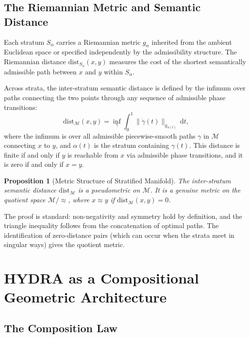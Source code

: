 \documentclass[12pt, a4paper, openany]{book}
\theoremstyle{plain}
\newtheorem{proposition}[theorem]{Proposition}
\theoremstyle{definition}
\theoremstyle{remark}
\begin{document}
\section{The Riemannian Metric and Semantic Distance}

Each stratum $S_\alpha$ carries a Riemannian metric $g_\alpha$ inherited from the ambient Euclidean space or specified independently by the admissibility structure. The Riemannian distance $\mathrm{dist}_{S_\alpha}(x, y)$ measures the cost of the shortest semantically admissible path between $x$ and $y$ within $S_\alpha$.

Across strata, the inter-stratum semantic distance is defined by the infimum over paths connecting the two points through any sequence of admissible phase transitions:
\[
\mathrm{dist}_{\mathcal{M}}(x, y) = \inf_{\gamma} \int_0^1 \|\dot\gamma(t)\|_{g_{\alpha(t)}} \, \mathrm{d}t,
\]
where the infimum is over all admissible piecewise-smooth paths $\gamma$ in $\mathcal{M}$ connecting $x$ to $y$, and $\alpha(t)$ is the stratum containing $\gamma(t)$. This distance is finite if and only if $y$ is reachable from $x$ via admissible phase transitions, and it is zero if and only if $x = y$.

\begin{proposition}[Metric Structure of Stratified Manifold]
The inter-stratum semantic distance $\mathrm{dist}_{\mathcal{M}}$ is a pseudometric on $\mathcal{M}$. It is a genuine metric on the quotient space $\mathcal{M} / {\approx}$, where $x \approx y$ if $\mathrm{dist}_{\mathcal{M}}(x,y) = 0$.
\end{proposition}

The proof is standard: non-negativity and symmetry hold by definition, and the triangle inequality follows from the concatenation of optimal paths. The identification of zero-distance pairs (which can occur when the strata meet in singular ways) gives the quotient metric.

\chapter{HYDRA as a Compositional Geometric Architecture}

\section{The Composition Law}
\end{document}
